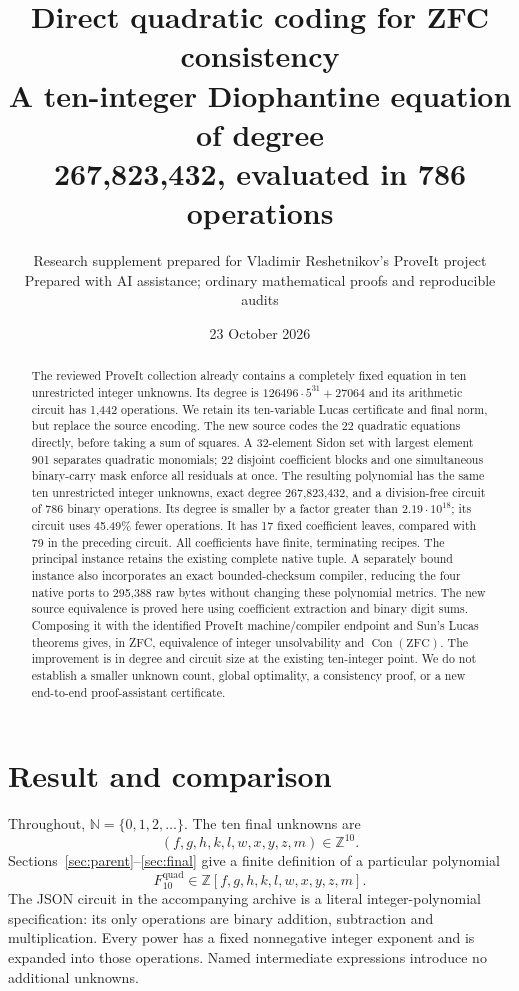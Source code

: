 \documentclass[11pt,letterpaper]{article}
\title{\textbf{Direct quadratic coding for ZFC consistency}\\[5pt]
\large A ten-integer Diophantine equation of degree\texorpdfstring{\\}{ }267,823,432, evaluated in 786 operations}
\author{Research supplement prepared for Vladimir Reshetnikov's ProveIt project\\
\small Prepared with AI assistance; ordinary mathematical proofs and reproducible audits}
\date{23 October 2026}
\theoremstyle{definition}\newtheorem{definition}[theorem]{Definition}
\theoremstyle{remark}\newtheorem{remark}[theorem]{Remark}
\newcommand{\N}{\mathbb N}
\newcommand{\Z}{\mathbb Z}
\newcommand{\Con}{\operatorname{Con}}
\begin{document}
\maketitle
\begin{abstract}
The reviewed ProveIt collection already contains a completely fixed equation in ten unrestricted integer unknowns. Its degree is
$126496\cdot5^{31}+27064$ and its arithmetic circuit has 1,442 operations.
We retain its ten-variable Lucas certificate and final norm, but replace the source encoding. The new source codes the 22 quadratic equations directly, before taking a sum of squares. A 32-element Sidon set with largest element 901 separates quadratic monomials; 22 disjoint coefficient blocks and one simultaneous binary-carry mask enforce all residuals at once.
The resulting polynomial has the same ten unrestricted integer unknowns, exact degree 267,823,432, and a division-free circuit of 786 binary operations. Its degree is smaller by a factor greater than $2.19\cdot10^{18}$; its circuit uses 45.49\% fewer operations. It has 17 fixed coefficient leaves, compared with 79 in the preceding circuit. All coefficients have finite, terminating recipes. The principal instance retains the existing complete native tuple. A separately bound instance also incorporates an exact bounded-checksum compiler, reducing the four native ports to 295,388 raw bytes without changing these polynomial metrics.
The new source equivalence is proved here using coefficient extraction and binary digit sums. Composing it with the identified ProveIt machine/compiler endpoint and Sun's Lucas theorems gives, in ZFC, equivalence of integer unsolvability and $\Con(\mathrm{ZFC})$. The improvement is in degree and circuit size at the existing ten-integer point. We do not establish a smaller unknown count, global optimality, a consistency proof, or a new end-to-end proof-assistant certificate.
\end{abstract}
\newpage
\begingroup\setlength{\parskip}{0pt}\small
\tableofcontents
\endgroup
\newpage

\section{Result and comparison}

Throughout, $\N=\{0,1,2,\ldots\}$. The ten final unknowns are
\[
 (f,g,h,k,l,w,x,y,z,m)\in\Z^{10}.
\]
Sections~\ref{sec:parent}--\ref{sec:final} give a finite definition of a particular polynomial
\[
 F_{10}^{\mathrm{quad}}\in\Z[f,g,h,k,l,w,x,y,z,m].
\]
The JSON circuit in the accompanying archive is a literal integer-polynomial specification: its only operations are binary addition, subtraction and multiplication. Every power has a fixed nonnegative integer exponent and is expanded into those operations. Named intermediate expressions introduce no additional unknowns.
\end{document}
